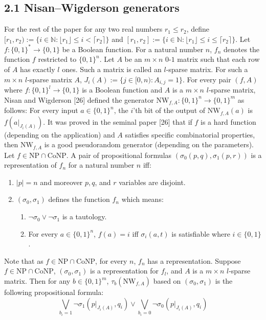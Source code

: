 \documentclass[10pt,a4paper]{article}
\begin{document}
\subsection*{2.1 Nisan–Wigderson generators}
For the rest of the paper for any two real numbers $r_1\leq r_2$, define $[r_1,r_2):=\{i\in\mathbb N:\lfloor r_1\rfloor\leq i<\lceil r_2\rceil\}$ and $[r_1,r_2]:=\{i\in\mathbb N:\lfloor r_1\rfloor\leq i\leq\lceil r_2\rceil\}$.
Let $f:\{0,1\}^*\to\{0,1\}$ be a Boolean function. For a natural number $n$, $f_n$ denotes the function $f$ restricted to $\{0,1\}^n$. Let $A$ be an $m\times n$ $0$-$1$ matrix such that each row of $A$ has exactly $l$ ones. Such a matrix is called an $l$-sparse matrix. For such a $m\times n$ $l$-sparse matrix $A$, $J_i(A):=\{j\in[0,n):A_{i,j}=1\}$.
For every pair $(f,A)$ where $f:\{0,1\}^l\to\{0,1\}$ is a Boolean function and $A$ is a $m\times n$ $l$-sparse matrix, Nisan and Wigderson [26] defined the generator $\mathrm{NW}_{f,A}:\{0,1\}^n\to\{0,1\}^m$ as follows:
For every input $a\in\{0,1\}^n$, the $i$'th bit of the output of $\mathrm{NW}_{f,A}(a)$ is $f(a|_{J_i(A)})$.
It was proved in the seminal paper [26] that if $f$ is a hard function (depending on the application) and $A$ satisfies specific combinatorial properties, then $\mathrm{NW}_{f,A}$ is a good pseudorandom generator (depending on the parameters).
Let $f\in\mathrm{NP}\cap\mathrm{CoNP}$. A pair of propositional formulas $(\sigma_0(p,q),\sigma_1(p,r))$ is a representation of $f_n$ for a natural number $n$ iff:
\begin{enumerate}
\item $|p|=n$ and moreover $p,q$, and $r$ variables are disjoint.
\item $(\sigma_0,\sigma_1)$ defines the function $f_n$ which means:
\begin{enumerate}
\item $\neg\sigma_0\vee\neg\sigma_1$ is a tautology.
\item For every $a\in\{0,1\}^n$, $f(a)=i$ iff $\sigma_i(a,t)$ is satisfiable where $i\in\{0,1\}$.
\end{enumerate}
\end{enumerate}
Note that as $f\in\mathrm{NP}\cap\mathrm{CoNP}$, for every $n$, $f_n$ has a representation.
Suppose $f\in\mathrm{NP}\cap\mathrm{CoNP}$, $(\sigma_0,\sigma_1)$ is a representation for $f_l$, and $A$ is a $m\times n$ $l$-sparse matrix. Then for any $b\in\{0,1\}^m$, $\tau_b(\mathrm{NW}_{f,A})$ based on $(\sigma_0,\sigma_1)$ is the following propositional formula:
\[\bigvee_{b_i=1}\neg\sigma_1(p|_{J_i(A)},q_i)\vee\bigvee_{b_i=0}\neg\sigma_0(p|_{J_i(A)},q_i)\]
\end{document}
